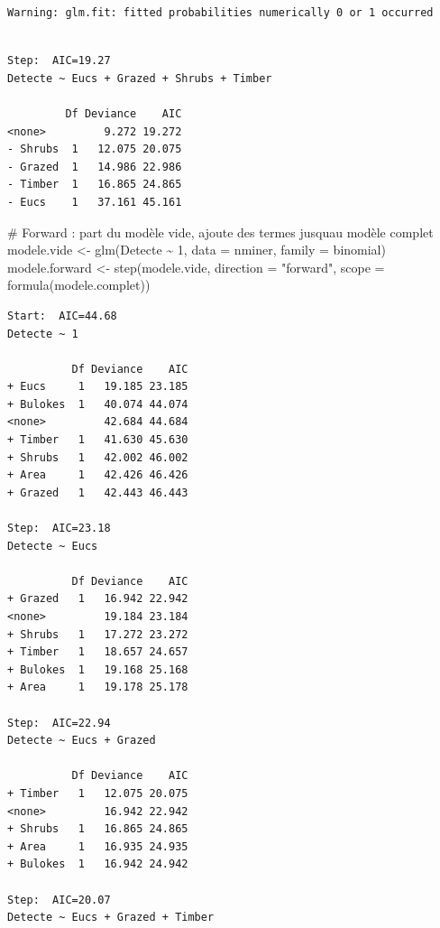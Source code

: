 \documentclass[
  french,
  letterpaper,
  DIV=11,
  numbers=noendperiod]{scrreprt}
\newenvironment{Shaded}{\begin{snugshade}}{\end{snugshade}}
\newcommand{\AttributeTok}[1]{\textcolor[rgb]{0.40,0.45,0.13}{#1}}
\newcommand{\CommentTok}[1]{\textcolor[rgb]{0.37,0.37,0.37}{#1}}
\newcommand{\DecValTok}[1]{\textcolor[rgb]{0.68,0.00,0.00}{#1}}
\newcommand{\FunctionTok}[1]{\textcolor[rgb]{0.28,0.35,0.67}{#1}}
\newcommand{\NormalTok}[1]{\textcolor[rgb]{0.00,0.23,0.31}{#1}}
\newcommand{\OtherTok}[1]{\textcolor[rgb]{0.00,0.23,0.31}{#1}}
\newcommand{\SpecialCharTok}[1]{\textcolor[rgb]{0.37,0.37,0.37}{#1}}
\newcommand{\StringTok}[1]{\textcolor[rgb]{0.13,0.47,0.30}{#1}}
\newcounter{none} %
\begin{document}
\begin{verbatim}
Warning: glm.fit: fitted probabilities numerically 0 or 1 occurred
\end{verbatim}

\begin{verbatim}

Step:  AIC=19.27
Detecte ~ Eucs + Grazed + Shrubs + Timber

         Df Deviance    AIC
<none>         9.272 19.272
- Shrubs  1   12.075 20.075
- Grazed  1   14.986 22.986
- Timber  1   16.865 24.865
- Eucs    1   37.161 45.161
\end{verbatim}

\begin{Shaded}
\begin{Highlighting}[]
\CommentTok{\# Forward : part du modèle vide, ajoute des termes jusqu\textquotesingle{}au modèle complet}
\NormalTok{modele.vide }\OtherTok{\textless{}{-}} \FunctionTok{glm}\NormalTok{(Detecte }\SpecialCharTok{\textasciitilde{}} \DecValTok{1}\NormalTok{, }\AttributeTok{data =}\NormalTok{ nminer, }\AttributeTok{family =}\NormalTok{ binomial)}
\NormalTok{modele.forward }\OtherTok{\textless{}{-}} \FunctionTok{step}\NormalTok{(modele.vide, }\AttributeTok{direction =} \StringTok{"forward"}\NormalTok{,}
                        \AttributeTok{scope =} \FunctionTok{formula}\NormalTok{(modele.complet))}
\end{Highlighting}
\end{Shaded}

\begin{verbatim}
Start:  AIC=44.68
Detecte ~ 1

          Df Deviance    AIC
+ Eucs     1   19.185 23.185
+ Bulokes  1   40.074 44.074
<none>         42.684 44.684
+ Timber   1   41.630 45.630
+ Shrubs   1   42.002 46.002
+ Area     1   42.426 46.426
+ Grazed   1   42.443 46.443

Step:  AIC=23.18
Detecte ~ Eucs

          Df Deviance    AIC
+ Grazed   1   16.942 22.942
<none>         19.184 23.184
+ Shrubs   1   17.272 23.272
+ Timber   1   18.657 24.657
+ Bulokes  1   19.168 25.168
+ Area     1   19.178 25.178

Step:  AIC=22.94
Detecte ~ Eucs + Grazed

          Df Deviance    AIC
+ Timber   1   12.075 20.075
<none>         16.942 22.942
+ Shrubs   1   16.865 24.865
+ Area     1   16.935 24.935
+ Bulokes  1   16.942 24.942

Step:  AIC=20.07
Detecte ~ Eucs + Grazed + Timber
\end{verbatim}
\end{document}
